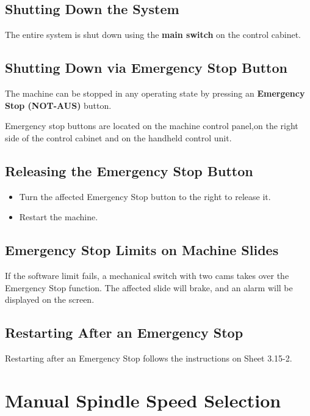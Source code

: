 \subsection{Shutting Down the System}
The entire system is shut down using the \textbf{main switch} on the control cabinet.

\subsection{Shutting Down via Emergency Stop Button}
The machine can be stopped in any operating state by pressing an \textbf{Emergency Stop (NOT-AUS)} button.

\vspace{.3cm}

\noindent Emergency stop buttons are located on the machine control panel,on the right side of the control cabinet and on the handheld control unit.

\subsection{Releasing the Emergency Stop Button}


\begin{itemize}
    \item Turn the affected Emergency Stop button to the right to release it.
    \item Restart the machine.
\end{itemize}

\subsection{Emergency Stop Limits on Machine Slides}
If the software limit fails, a mechanical switch with two cams takes over the Emergency Stop function.  
The affected slide will brake, and an alarm will be displayed on the screen.

\subsection{Restarting After an Emergency Stop}
Restarting after an Emergency Stop follows the instructions on Sheet 3.15-2.

\section{Manual Spindle Speed Selection}

